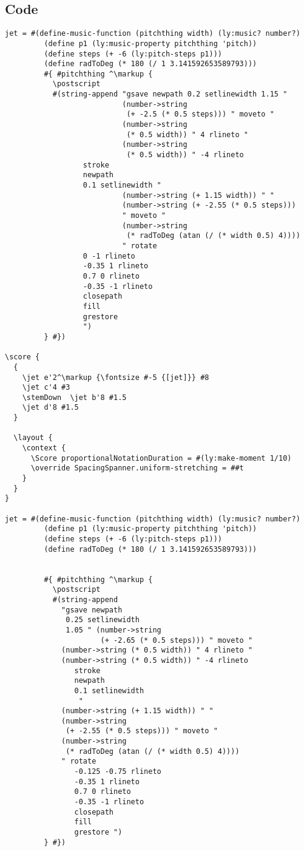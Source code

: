 \documentclass[11pt, oneside]{book}   	%
\begin{document}
\subsection{Code}
\begin{verbatim}
jet = #(define-music-function (pitchthing width) (ly:music? number?)
         (define p1 (ly:music-property pitchthing 'pitch))
         (define steps (+ -6 (ly:pitch-steps p1)))
         (define radToDeg (* 180 (/ 1 3.141592653589793)))
         #{ #pitchthing ^\markup {
           \postscript
           #(string-append "gsave newpath 0.2 setlinewidth 1.15 "
                           (number->string 
                           	(+ -2.5 (* 0.5 steps))) " moveto "
                           (number->string 
                           	(* 0.5 width)) " 4 rlineto "
                           (number->string 
                           	(* 0.5 width)) " -4 rlineto
                  stroke
                  newpath
                  0.1 setlinewidth "
                           (number->string (+ 1.15 width)) " "
                           (number->string (+ -2.55 (* 0.5 steps)))
                           " moveto "
                           (number->string   
                            (* radToDeg (atan (/ (* width 0.5) 4))))
                           " rotate
                  0 -1 rlineto
                  -0.35 1 rlineto
                  0.7 0 rlineto
                  -0.35 -1 rlineto
                  closepath
                  fill
                  grestore
                  ")
         } #})

\score {
  {
    \jet e'2^\markup {\fontsize #-5 {[jet]}} #8
    \jet c'4 #3
    \stemDown  \jet b'8 #1.5
    \jet d'8 #1.5
  }

  \layout {
    \context {
      \Score proportionalNotationDuration = #(ly:make-moment 1/10)
      \override SpacingSpanner.uniform-stretching = ##t
    }
  }
}

jet = #(define-music-function (pitchthing width) (ly:music? number?)
         (define p1 (ly:music-property pitchthing 'pitch))
         (define steps (+ -6 (ly:pitch-steps p1)))
         (define radToDeg (* 180 (/ 1 3.141592653589793)))


         #{ #pitchthing ^\markup {
           \postscript
           #(string-append
             "gsave newpath 
              0.25 setlinewidth 
              1.05 " (number->string
                      (+ -2.65 (* 0.5 steps))) " moveto "
             (number->string (* 0.5 width)) " 4 rlineto "
             (number->string (* 0.5 width)) " -4 rlineto
                stroke
                newpath
                0.1 setlinewidth 
                 "
             (number->string (+ 1.15 width)) " "
             (number->string
              (+ -2.55 (* 0.5 steps))) " moveto "
             (number->string
              (* radToDeg (atan (/ (* width 0.5) 4))))
             " rotate
                -0.125 -0.75 rlineto
                -0.35 1 rlineto
                0.7 0 rlineto
                -0.35 -1 rlineto
                closepath              
                fill
                grestore ")
         } #})



\end{verbatim}
\end{document}
